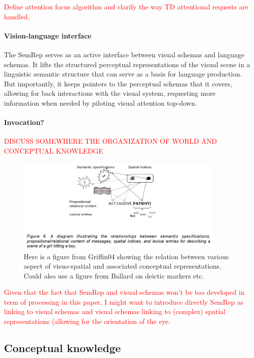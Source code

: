 \documentclass{article}
\newcommand\todo[1]{\textcolor{red}{#1}}
\begin{document}
\todo{Define attention focus algorithm and clarify the way TD attentional requests are handled.}

\paragraph{Vision-language interface}
The SemRep serves as an active interface between visual schemas and language schemas. It lifts the structured perceptual representations of the visual scene in a linguistic semantic structure that can serve as a basis for language production. But importantly, it keeps pointers to the perceptual schemas that it covers, allowing for back interactions with the visual system, requesting more information when needed by piloting visual attention top-down.

\paragraph{Invocation?}


\todo{DISCUSS SOMEWHERE THE ORGANIZATION OF WORLD AND CONCEPTUAL KNOWLEDGE}

\begin{figure}[H]
	\centering
	\includegraphics[width=4.0in]{Figures/Griffin04_1.png}
	\caption{Here is a figure from Griffin04 showing the relation between various aspect of visuo-spatial and associated conceptual representations. Could also use a figure from Ballard on deictic markers etc.}
	\label{griffin04}
\end{figure}

\todo{Given that the fact that SemRep and visual schemas won't be too developed in term of processing in this paper, I might want to introduce directly SemRep as linking to visual schemas and visual schemas linking to (complex) spatial representations (allowing for the orientation of the eye.}

\subsection{Conceptual knowledge}
\label{subsec:conceptual_knowledge}
\end{document}
